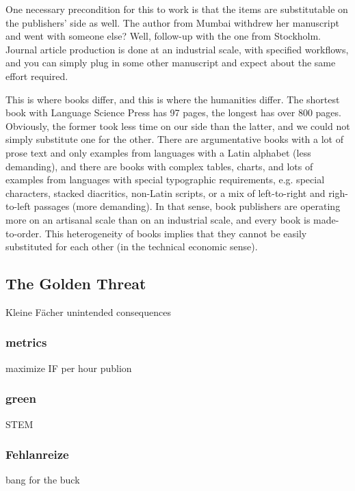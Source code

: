 \documentclass[12pt]{article}
\begin{document}
 One necessary precondition for this to work is that the items are substitutable on the publishers' side as well. The author from Mumbai withdrew her manuscript and went with someone else? Well, follow-up with the one from Stockholm. Journal article production is done at an industrial scale, with specified workflows, and you can simply plug in some other manuscript and expect about the same effort required. 
 
 This is where books differ, and this is where the humanities differ. The shortest book with Language Science Press has 97 pages, the longest has over 800 pages. Obviously, the former took less time on our side than the latter, and we could not simply substitute one for the other. There are argumentative books with a lot of prose text and only examples from languages with a Latin alphabet (less demanding), and there are books with complex tables, charts, and lots of examples from languages with special typographic requirements, e.g. special characters, stacked diacritics, non-Latin scripts, or a mix of left-to-right and righ-to-left passages (more demanding). In that sense, book publishers are operating more on an artisanal scale than on an industrial scale, and every book is made-to-order. This heterogeneity of books implies that they cannot be easily substituted for each other (in the technical economic sense).
 
 
 
 
 
 
 
 
 
 
 
 
 
 

\subsection{The Golden Threat}
            Kleine Fächer
            unintended consequences
\subsubsection{metrics}
                    maximize IF per hour
                        publion
\subsubsection{green}
                    STEM
\subsubsection{Fehlanreize}
            bang for the buck
\end{document}
